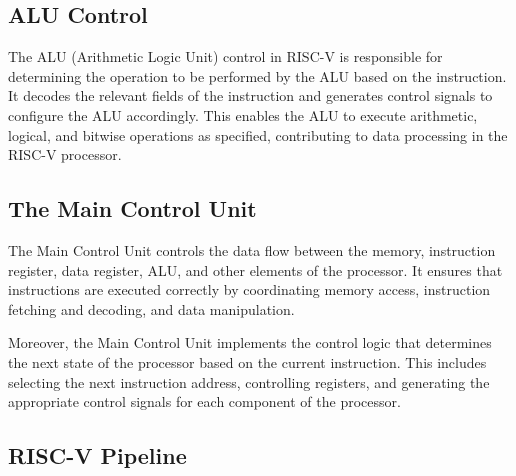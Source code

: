        \subsection{ALU Control}

            The ALU (Arithmetic Logic Unit) control in RISC-V is responsible for determining the operation to be performed by the ALU based on the instruction. It decodes the relevant fields of the instruction and generates control signals to configure the ALU accordingly. This enables the ALU to execute arithmetic, logical, and bitwise operations as specified, contributing to data processing in the RISC-V processor.
        
        
       \subsection{The Main Control Unit}

            The Main Control Unit controls the data flow between the memory, instruction register, data register, ALU, and other elements of the processor. It ensures that instructions are executed correctly by coordinating memory access, instruction fetching and decoding, and data manipulation.
            
            Moreover, the Main Control Unit implements the control logic that determines the next state of the processor based on the current instruction. This includes selecting the next instruction address, controlling registers, and generating the appropriate control signals for each component of the processor.
            
        \subsection{RISC-V Pipeline}
            
